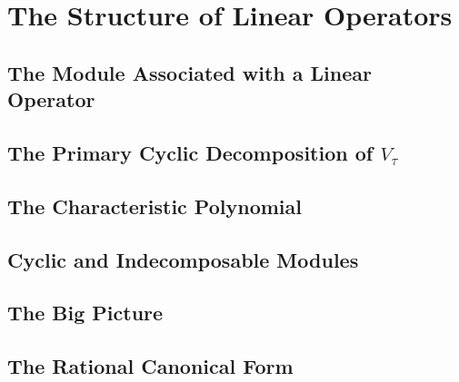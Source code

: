 \chapter{The Structure of Linear Operators}
\section{The Module Associated with a Linear Operator}
\section{The Primary Cyclic Decomposition of $V_\tau$}
\section{The Characteristic Polynomial}
\section{Cyclic and Indecomposable Modules}
\section{The Big Picture}
\section{The Rational Canonical Form}
